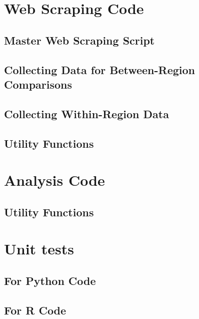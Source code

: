 \documentclass{article}\usepackage[]{graphicx}\usepackage[]{color}
\begin{document}

\section{Web Scraping Code}
\subsection{Master Web Scraping Script}

\subsection{Collecting Data for Between-Region Comparisons}

\subsection{Collecting Within-Region Data}

\subsection{Utility Functions}

\section{Analysis Code}

\subsection{Utility Functions}

\section{Unit tests}
\subsection{For Python Code}


\subsection{For R Code}

\end{document}
